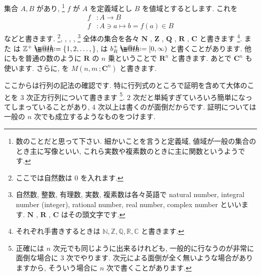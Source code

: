 \documentclass[openany, a4paper, oneside]{book}
\makeatletter
\newcommand*{\defeq}{\mathrel{\rlap{%
\raisebox{0.3ex}{$\m@th\cdot$}}%
\raisebox{-0.3ex}{$\m@th\cdot$}}%
=}
\theoremstyle{break}
\theoremstyle{breakdefn}
\newcommand{\bbZ}{\mathbb{Z}}
\makeatother
\begin{document}
集合 $A,B$ があり,  \footnote{数のことだと思って下さい.
細かいことを言うと定義域, 値域が一般の集合のとき主に写像といい,
これら実数や複素数のときに主に関数というようです.
 }
$f$ が $A$ を定義域とし $B$ を値域とするとします.
これを
\begin{align}
f &:  A \rightarrow B \\
f &: A\ni  a \mapsto     b=f (a)\in B
\end{align}
などと書きます.
 \footnote{ここでは自然数は $0$ を入れます.
 }, , ,
,  \footnote{自然数, 整数, 有理数, 実数, 複素数は各々英語で natural number, integral number (integer),
rational number, real number, complex number といいます.  $\bm{N}$ ,  $\bm{R}$ ,  $\bm{C}$ はその頭文字です.
 }
全体の集合を各々
$\bm{N}$ ,  $\bm{Z}$ ,  $\bm{Q}$ ,  $\bm{R}$ ,  $\bm{C}$ と書きます \footnote{それぞれ手書きするときは $\mathbb{N},\mathbb{Z},\mathbb{Q},\mathbb{R},\mathbb{C}$ と書きます.
 }.
また
は
$\bbZ^+ \defeq \{ 1, 2 , \dots , \}$,
は
 $b_R^+ \defeq [ 0 , \infty )$
と書くことがあります.
他にもを普通の数のように $\bm{R}$ の $n$ 乗ということで $\bm{R}^{n}$ と書きます.
あとで $\bm{C}^{n}$ も使います.
さらに, を $M \left ( n,m \, ;\bm{C}^n \right)$ と書きます.

ここからは行列の記法の確認です. 特に行列式のところで証明を含めて大体のことを 3 次正方行列について書きます \footnote{正確には $n$ 次元でも同じように出来るけれども, 一般的に行なうのが非常に面倒な場合に 3 次でやります.
次元による面倒が全く無いような場合がありますから, そういう場合に $n$ 次で書くことがあります.
 }.
2 次だと単純すぎていろいろ簡単になってしまっていることがあり,
4 次以上は書くのが面倒だからです.
証明については一般の $n$ 次でも成立するようなものをつけます.
\end{document}
